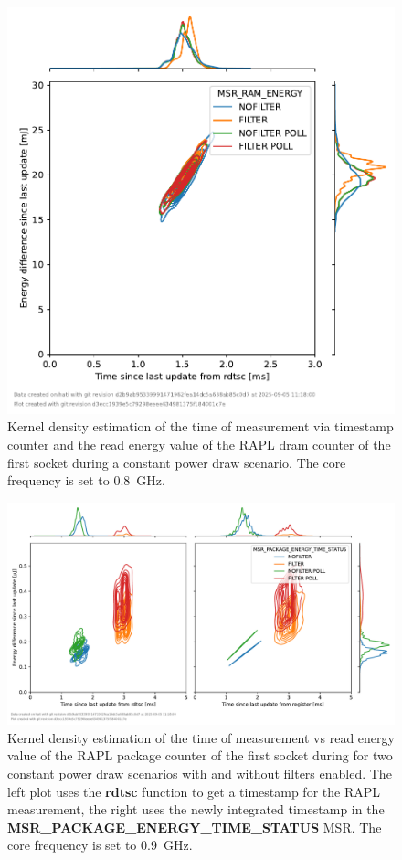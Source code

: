 \begin{figure}[]
    \centering
    \includegraphics[width=0.54\columnwidth]{fig/rapl-update-intervals/MSR_RAM_ENERGY_800000.pdf}
    \caption{Kernel density estimation of the time of measurement via timestamp counter and the read energy value of the RAPL dram counter of the first socket during a constant power draw scenario.
    The core frequency is set to \SI{0.8}{\GHz}.}
\end{figure}

\clearpage
\begin{figure}[]
    \centering
    \includegraphics[width=\columnwidth]{fig/rapl-update-intervals/MSR_PACKAGE_ENERGY_TIME_STATUS_900000.pdf}
    \caption{Kernel density estimation of the time of measurement vs read energy value of the RAPL package counter of the first socket during for two constant power draw scenarios with and without filters enabled.
    The left plot uses the \textbf{rdtsc} function to get a timestamp for the RAPL measurement, the right uses the newly integrated timestamp in the \textbf{MSR\_PACKAGE\_ENERGY\_TIME\_STATUS} MSR.
    The core frequency is set to \SI{0.9}{\GHz}.}
\end{figure}

